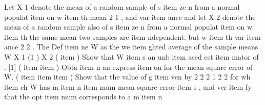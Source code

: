 Let X 1 denote the mean of a random sample of s%
item ze n from a normal populat%
item on w%
item th
mean
2
1 ,
and var%
item ance
and let X 2 denote the mean of a random sample also of
s%
item ze n from a normal populat%
item on w%
item th the same mean
two samples are %
item ndependent.
but w%
item th var%
item ance
2
2 .
The
Def%
item ne W as the we%
item ghted average of the sample means
W
X 1 (1
) X 2
(%
item ) Show that W %
item s an unb%
item ased est%
item mator of . [1]
(%
item %
item ) Obta%
item n an express%
item on for the mean square error of W. 
(%
item %
item %
item ) Show that the value of
g%
item ven by
2
2
2
1
2
2
for wh%
item ch W has m%
item n%
item mum mean square error %
item s
,
and ver%
item fy that the opt%
item mum corresponds to a m%
item n%
